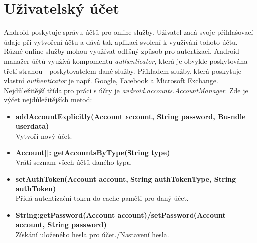\documentclass{diplomka}
\begin{document}
\section{Uživatelský účet}
Android poskytuje správu účtů pro online služby. Uživatel zadá svoje přihlašovací údaje při vytvoření účtu a dává tak aplikaci svolení k využívání tohoto účtu.\\ \indent
Různé online služby mohou využívat odlišný způsob pro autentizaci. Android manažer účtů využívá kompomentu \emph{authenticator}\cite{accman}, která je obvykle poskytována třetí stranou - poskytovatelem dané služby. Příkladem služby, která poskytuje vlastní \emph{authenticator} je např. Google, Facebook a Microsoft Exchange.\\ \indent
Nejdůležitější třída pro práci s účty je \emph{	android.accounts.AccountManager}. Zde je výčet nejdůležitějších metod:
\begin{itemize}[]
\item \textbf{addAccountExplicitly(Account account, String password, Bu-ndle userdata)}\\
Vytvoří nový účet.
\item \textbf{Account[]: getAccountsByType(String type)}\\
Vrátí seznam všech účtů daného typu.
\item \textbf{setAuthToken(Account account, String authTokenType, String authToken)}\\
Přidá autentizační token do cache paměti pro daný účet.
\item \textbf{String:getPassword(Account account)/setPassword(Account account, String password)}\\
Získání uloženého hesla pro účet./Nastavení hesla.
\end{itemize}
\end{document}
